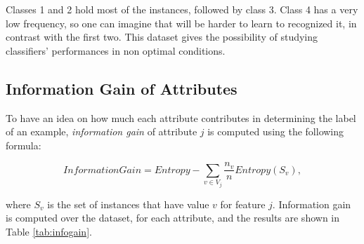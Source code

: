 \documentclass[a4paper, 10pt]{article}
\begin{document}
Classes 1 and 2 hold most of the instances, followed by class 3. Class 4 has a very low frequency, so one can imagine that will be harder to learn to recognized it, in contrast with the first two. This dataset gives the possibility of studying classifiers' performances in non optimal conditions.

\subsection{Information Gain of Attributes}
To have an idea on how much each attribute contributes in determining the label of an example, \emph{information gain} of attribute $j$ is computed using the following formula:

\begin{equation}
	\textit{InformationGain} = \textit{Entropy} - \sum_{v \in \textit{V}_j}\dfrac{n_v}{n}\textit{Entropy}(S_v),
\end{equation}

where $S_v$ is the set of instances that have value $v$ for feature $j$. Information gain is computed over the dataset, for each attribute, and the results are shown in Table \ref{tab:infogain}.
\end{document}
